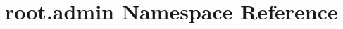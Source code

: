 \hypertarget{namespaceroot_1_1admin}{\section{root.\-admin Namespace Reference}
\label{namespaceroot_1_1admin}
}
